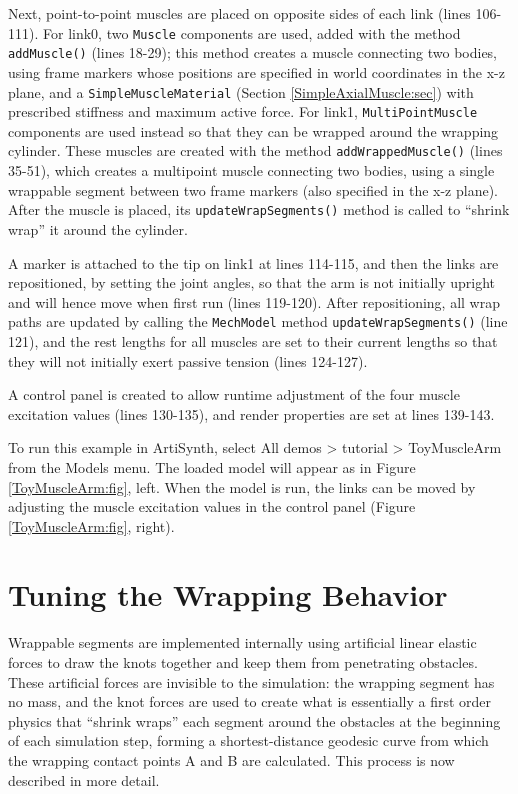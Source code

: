 Next, point-to-point muscles are placed on opposite sides of each link (lines
106-111). For link0, two {\tt Muscle} components are used, added with the
method {\tt addMuscle()} (lines 18-29); this method creates a muscle connecting
two bodies, using frame markers whose positions are specified in world
coordinates in the x-z plane, and a {\tt SimpleMuscleMaterial}
(Section \ref{SimpleAxialMuscle:sec}) with prescribed stiffness and maximum
active force. For link1, {\tt MultiPointMuscle} components are used instead so
that they can be wrapped around the wrapping cylinder. These muscles are created
with the method {\tt addWrappedMuscle()} (lines 35-51), which creates a
multipoint muscle connecting two bodies, using a single wrappable segment
between two frame markers (also specified in the x-z plane). After the muscle
is placed, its {\tt updateWrapSegments()} method is called to ``shrink wrap''
it around the cylinder.

A marker is attached to the tip on link1 at lines 114-115, and then the links
are repositioned, by setting the joint angles, so that the arm is not initially
upright and will hence move when first run (lines 119-120). After
repositioning, all wrap paths are updated by calling the {\tt MechModel} method
{\tt updateWrapSegments()} (line 121), and the rest lengths for all muscles are
set to their current lengths so that they will not initially exert passive
tension (lines 124-127).

A control panel is created to allow runtime adjustment of the four muscle
excitation values (lines 130-135), and render properties are set at lines
139-143.

To run this example in ArtiSynth, select {\sf All demos > tutorial >
ToyMuscleArm} from the {\sf Models} menu. The loaded model will appear as in
Figure \ref{ToyMuscleArm:fig}, left. When the model is run, the links can be
moved by adjusting the muscle excitation values in the control panel
(Figure \ref{ToyMuscleArm:fig}, right).

\section{Tuning the Wrapping Behavior}
\label{wrapTuning:sec}

Wrappable segments are implemented internally using artificial linear
elastic forces to draw the knots together and keep them from
penetrating obstacles. These artificial forces are invisible to the
simulation: the wrapping segment has no mass, and the knot forces are
used to create what is essentially a first order physics that ``shrink
wraps'' each segment around the obstacles at the beginning of each
simulation step, forming a shortest-distance geodesic curve from
which the wrapping contact points A and B are calculated. This process
is now described in more detail.

